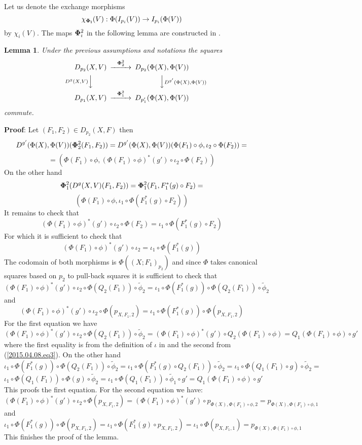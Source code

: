 \documentclass[12pt]{article}
\newenvironment{myproof}{{\bf Proof}:}{\vskip 5mm }
\newtheorem{lemma}[proposition]{Lemma}
\newcommand{\llabel}[1]{\label{#1}}
\newcommand{\sr}{\rightarrow}
\newcommand{\wt}{\widetilde}
\begin{document}
%
Let us denote the exchange morphisms
%
$$\chi_{\bf\Phi_i}(V):\Phi(I_{p_i}(V))\sr I_{p_i}(\Phi(V))$$
%
by $\chi_i(V)$. The maps ${\bf\Phi}_i^2$ in the following lemma are constructed in \cite[Construction 5.2]{fromunivwithPi}. 
%
\begin{lemma}
\llabel{2015.04.08.l1}
Under the previous assumptions and notations the squares
%
$$
\begin{CD}
D_{p_2}(X,V) @>{\bf\Phi}_2^2>> D_{p_2}(\Phi(X),\Phi(V))\\
@V{D^g(X,V)} VV @VV {D^{g'}(\Phi(X),\Phi(V))}V\\
D_{p_1}(X,V) @>{\bf\Phi}_1^2>> D_{p_1'}(\Phi(X),\Phi(V))
\end{CD}
$$
%
commute.
\end{lemma}
%
\begin{myproof}
Let $(F_1,F_2)\in D_{p_2}(X,F)$ then
%
$$D^{g'}(\Phi(X),\Phi(V))({\bf\Phi}_2^2(F_1,F_2))=D^{g'}(\Phi(X),\Phi(V))(\Phi(F_1)\circ \phi, \iota_2\circ \Phi(F_2))=$$
$$=(\Phi(F_1)\circ \phi, (\Phi(F_1)\circ \phi)^*(g')\circ \iota_2\circ \Phi(F_2))$$
%
On the other hand
%
$${\bf\Phi}_1^2(D^g(X,V)(F_1,F_2))={\bf\Phi}_1^2(F_1,F_1^*(g)\circ F_2)=$$
$$(\Phi(F_1)\circ\phi,\iota_1\circ \Phi(F_1^*(g)\circ F_2))$$
%
It remains to check that 
%
$$(\Phi(F_1)\circ \phi)^*(g')\circ \iota_2\circ \Phi(F_2)=\iota_1\circ \Phi(F_1^*(g)\circ F_2)$$
%
For which it is sufficient to check that
%
$$(\Phi(F_1)\circ \phi)^*(g')\circ \iota_2=\iota_1\circ \Phi(F_1^*(g))$$
%
The codomain of both morphisms is $\Phi((X;F_1)_{p_2})$ and since $\Phi$ takes canonical squares based on $p_2$ to pull-back squares it is sufficient to check that 
%
$$(\Phi(F_1)\circ \phi)^*(g')\circ \iota_2\circ \Phi(Q_2(F_1))\circ\wt{\phi}_2=\iota_1\circ \Phi(F_1^*(g))\circ \Phi(Q_2(F_1))\circ\wt{\phi}_2$$
%
and
%
$$(\Phi(F_1)\circ \phi)^*(g')\circ \iota_2\circ \Phi(p_{X,F_1,2})=\iota_1\circ \Phi(F_1^*(g))\circ \Phi(p_{X,F_1,2})$$
%
For the first equation we have
%
$$(\Phi(F_1)\circ \phi)^*(g')\circ \iota_2\circ \Phi(Q_2(F_1))\circ\wt{\phi}_2=(\Phi(F_1)\circ \phi)^*(g')\circ Q_2(\Phi(F_1)\circ \phi)=Q_1(\Phi(F_1)\circ\phi)\circ g'$$
%
where the first equality is from the definition of $\iota$ in \cite[Construction 5.2]{fromunivwithPi} and the second from (\ref{2015.04.08.eq3}). On the other hand
%
$$\iota_1\circ \Phi(F_1^*(g))\circ \Phi(Q_2(F_1))\circ\wt{\phi}_2=\iota_1\circ\Phi(F_1^*(g)\circ Q_2(F_1))\circ \wt{\phi}_2=\iota_1\circ \Phi(Q_1(F_1)\circ g)\circ \wt{\phi}_2=$$
$$\iota_1\circ \Phi(Q_1(F_1))\circ \Phi(g)\circ \wt{\phi}_2=\iota_1\circ \Phi(Q_1(F_1))\circ \wt{\phi}_1\circ g'=Q_1(\Phi(F_1)\circ \phi)\circ g'$$
%
This proofs the first equation. For the second equation we have:
%
$$(\Phi(F_1)\circ \phi)^*(g')\circ \iota_2\circ \Phi(p_{X,F_1,2})=(\Phi(F_1)\circ \phi)^*(g')\circ p_{\Phi(X),\Phi(F_1)\circ\phi,2}=p_{\Phi(X),\Phi(F_1)\circ\phi,1}$$
%
and
%
$$\iota_1\circ \Phi(F_1^*(g))\circ \Phi(p_{X,F_1,2})=\iota_1\circ \Phi(F_1^*(g)\circ p_{X,F_1,2})=\iota_1\circ \Phi(p_{X,F_1,1})=p_{\Phi(X),\Phi(F_1)\circ \phi,1}$$
%
This finishes the proof of the lemma. 
\end{myproof}
\end{document}
